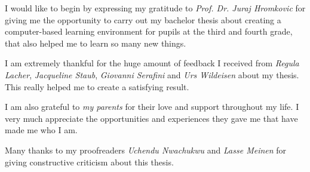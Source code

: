 I would like to begin by expressing my gratitude to \textit{Prof. Dr. Juraj Hromkovic} for giving me the opportunity to carry out my bachelor thesis about creating a computer-based learning environment for pupils at the third and fourth grade, that also helped me to learn so many new things.

I am extremely thankful for the huge amount of feedback I received from \textit{Regula Lacher}, \textit{Jacqueline Staub}, \textit{Giovanni Serafini} and \textit{Urs Wildeisen} about my thesis. This really helped me to create a satisfying result. 

I am also grateful to \textit{my parents} for their love and support throughout my life. I very much appreciate the opportunities and experiences they gave me that have made me who I am.

Many thanks to my proofreaders \textit{Uchendu Nwachukwu} and \textit{Lasse Meinen} for giving constructive criticism about this thesis.